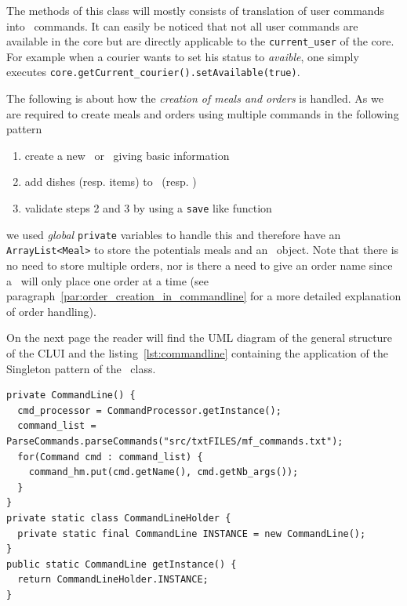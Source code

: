 The methods of this class will mostly consists of translation
of user commands into \Core~commands.
It can easily be noticed that not all user commands are available in
the core but are directly applicable to the \lstinline|current_user|
of the core. For example when a courier wants to set his status
to \emph{avaible},
one simply executes \lstinline|core.getCurrent_courier().setAvailable(true)|.

The following is about how the \emph{creation of meals and orders} is handled. 
As we are required to create meals and orders
using multiple commands in the following pattern
\begin{enumerate}
  \item create a new \Meal~or \Order~giving basic information
  \item add dishes (resp. items) to \Meal~(resp. \Order)
  \item validate steps 2 and 3 by using a \lstinline|save| like function
\end{enumerate}
we used \emph{global} \lstinline|private| variables to handle this and therefore have an \lstinline|ArrayList<Meal>|
to store the potentials meals and an \Order~object.
Note that there is no need to store multiple orders, nor is there a need to give an order
name since a \Customer~will only place one order at a time
(see paragraph~\ref{par:order_creation_in_commandline} for a more detailed
explanation of order handling).

On the next page the reader will find the UML diagram of the
general structure of the CLUI and the listing~\ref{lst:commandline}
containing the application of the Singleton pattern of the
\CommandLine~class.
  
\begin{lstlisting}[caption=Singleton pattern with CommandLine class.,
   label=lst:commandline] 
private CommandLine() {
  cmd_processor = CommandProcessor.getInstance();
  command_list = ParseCommands.parseCommands("src/txtFILES/mf_commands.txt");
  for(Command cmd : command_list) {
    command_hm.put(cmd.getName(), cmd.getNb_args());
  }
}
private static class CommandLineHolder {
  private static final CommandLine INSTANCE = new CommandLine();
}
public static CommandLine getInstance() {
  return CommandLineHolder.INSTANCE;
}
\end{lstlisting}

\vspace{1cm}

